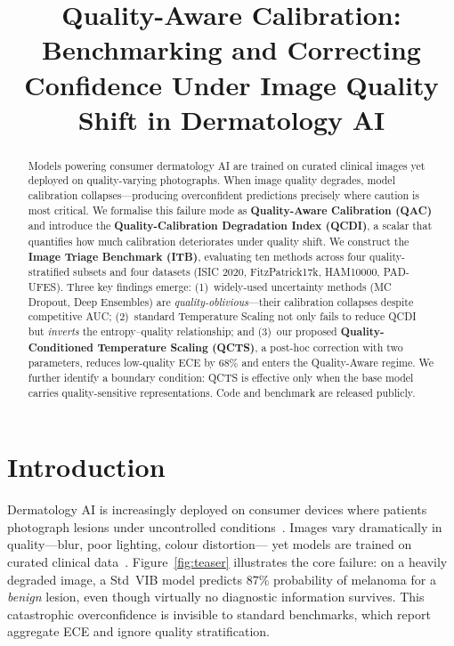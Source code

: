 \documentclass{bmvc2k}
\title{Quality-Aware Calibration: Benchmarking and Correcting\\
       Confidence Under Image Quality Shift in Dermatology AI}
\begin{document}
\maketitle

\begin{abstract}
Models powering consumer dermatology AI are trained on curated clinical images
yet deployed on quality-varying photographs. When image quality degrades, model
calibration collapses---producing overconfident predictions precisely where
caution is most critical. We formalise this failure mode as
\textbf{Quality-Aware Calibration (QAC)} and introduce the
\textbf{Quality-Calibration Degradation Index (QCDI)}, a scalar that quantifies
how much calibration deteriorates under quality shift. We construct the
\textbf{Image Triage Benchmark (ITB)}, evaluating ten methods across four
quality-stratified subsets and four datasets (ISIC 2020, FitzPatrick17k,
HAM10000, PAD-UFES). Three key findings emerge: (1)~widely-used uncertainty
methods (MC Dropout, Deep Ensembles) are \emph{quality-oblivious}---their
calibration collapses despite competitive AUC; (2)~standard Temperature
Scaling not only fails to reduce QCDI but \emph{inverts} the entropy--quality
relationship; and (3)~our proposed \textbf{Quality-Conditioned Temperature
Scaling (QCTS)}, a post-hoc correction with two parameters, reduces
low-quality ECE by 68\% and enters the Quality-Aware regime. We further
identify a boundary condition: QCTS is effective only when the base model
carries quality-sensitive representations. Code and benchmark are released
publicly.
\end{abstract}

\section{Introduction}

Dermatology AI is increasingly deployed on consumer devices where patients
photograph lesions under uncontrolled conditions~\cite{esteva2017dermatologist,tschandl2020human}.
Images vary dramatically in quality---blur, poor lighting, colour distortion---
yet models are trained on curated clinical
data~\cite{codella2018skin,tschandl2019ham10000}. Figure~\ref{fig:teaser}
illustrates the core failure: on a heavily degraded image, a Std~VIB model
predicts 87\% probability of melanoma for a \emph{benign} lesion, even though
virtually no diagnostic information survives. This catastrophic overconfidence
is invisible to standard benchmarks, which report aggregate ECE and ignore
quality stratification.
\end{document}

